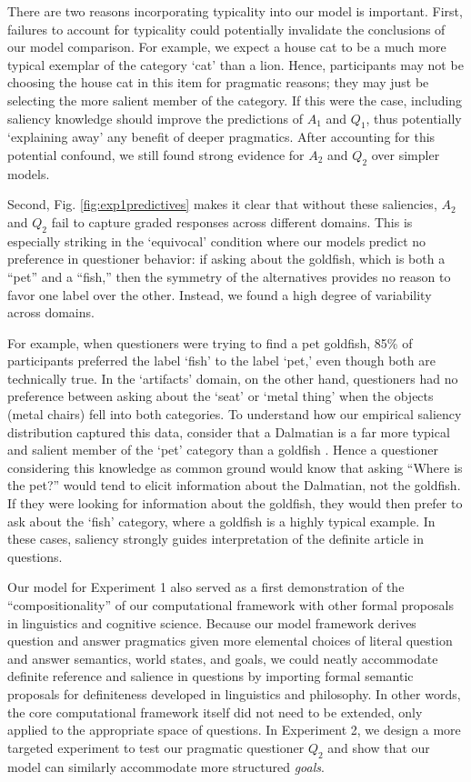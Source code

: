 \documentclass[12pt, floatsintext, jou]{apa6}
\begin{document}
There are two reasons incorporating typicality into our model is important. 
First, failures to account for typicality could potentially invalidate the conclusions of our model comparison. 
For example, we expect a house cat to be a much more typical exemplar of the category `cat' than a lion. 
Hence, participants may not be choosing the house cat in this item for pragmatic reasons; they may just be selecting the more salient member of the category. 
If this were the case, including saliency knowledge should improve the predictions of $A_1$ and $Q_1$, thus potentially `explaining away' any benefit of deeper pragmatics. 
After accounting for this potential confound, we still found strong evidence for $A_2$ and $Q_2$ over simpler models.

Second, Fig. \ref{fig:exp1predictives} makes it clear that without these saliencies, $A_2$ and $Q_2$ fail to capture graded responses across different domains. 
This is especially striking in the `equivocal' condition where our models predict no preference in questioner behavior: if asking about the goldfish, which is both a ``pet'' and a ``fish,'' then the symmetry of the alternatives provides no reason to favor one label over the other. 
Instead, we found a high degree of variability across domains. 

For example, when questioners were trying to find a pet goldfish, 85\% of participants preferred the label `fish' to the label `pet,' even though both are technically true. 
In the `artifacts' domain, on the other hand, questioners had no preference between asking about the `seat' or `metal thing' when the objects (metal chairs) fell into both categories.
To understand how our empirical saliency distribution captured this data, consider that a Dalmatian is a far more typical and salient member of the `pet' category than a goldfish \cite{Rosch75}. 
Hence a questioner considering this knowledge as common ground would know that asking ``Where is the pet?'' would tend to elicit information about the Dalmatian, not the goldfish. 
If they were looking for information about the goldfish, they would then prefer to ask about the `fish' category, where a goldfish is a highly typical example. 
In these cases, saliency strongly guides interpretation of the definite article in questions.

Our model for Experiment 1 also served as a first demonstration of the ``compositionality'' of our computational framework with other formal proposals in linguistics and cognitive science.
Because our model framework derives question and answer pragmatics given more elemental choices of literal question and answer semantics, world states, and goals, we could neatly accommodate definite reference and salience in questions by importing formal semantic proposals for definiteness developed in linguistics and philosophy.
In other words, the core computational framework itself did not need to be extended, only applied to the appropriate space of questions. 
In Experiment 2, we design a more targeted experiment to test our pragmatic questioner $Q_2$ and show that our model can similarly accommodate more structured \emph{goals}.
\end{document}
